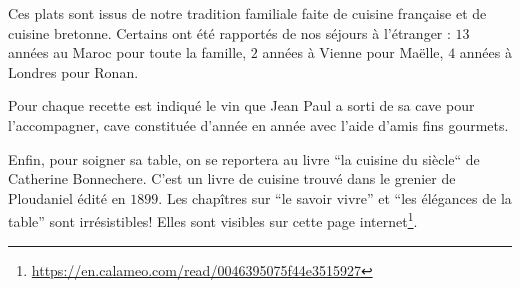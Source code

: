 Ces plats sont issus de notre tradition familiale faite de cuisine française et de cuisine bretonne. Certains ont été rapportés de nos séjours à l’étranger : $13$ années au Maroc pour toute la famille, $2$ années à Vienne pour Maëlle, $4$ années à Londres pour Ronan.

Pour chaque recette est indiqué le vin que Jean Paul a sorti de sa cave pour l’accompagner, cave constituée d’année en année avec l’aide d’amis fins gourmets.

Enfin, pour soigner sa table, on se reportera au livre “la cuisine du siècle“ de Catherine Bonnechere. C’est un livre de cuisine trouvé dans le grenier de Ploudaniel édité en $1899$. Les chapîtres sur “le savoir vivre” et “les élégances de la table” sont irrésistibles! Elles sont visibles sur cette page internet\footnote{\url{https://en.calameo.com/read/0046395075f44e3515927}}.
\fi

